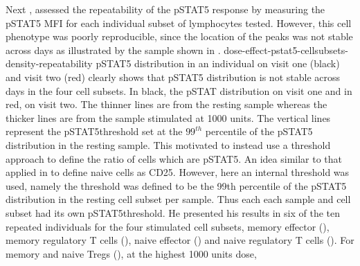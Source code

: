 Next , assessed the repeatability of the pSTAT5 response by measuring the pSTAT5 \gls{MFI}
for each individual subset of lymphocytes tested.
However, this cell phenotype was poorly reproducible, since the location of the peaks was not stable across days as illustrated
by the sample shown in .
{dose-effect-pstat5-cellsubsets-density-repeatability}
{ pSTAT5 distribution in an individual on visit one (black) and visit two (red) clearly shows that pSTAT5 distribution is not stable across days in the four cell
subsets. }
{
In black, the pSTAT distribution on visit one and in red, on visit two.
The thinner lines are from the resting sample whereas the thicker lines are from the sample stimulated at 1000 units.
The vertical lines represent the pSTAT5\positive threshold set at the $99^{th}$ percentile of the pSTAT5 distribution in the resting sample.
}
This motivated  to instead use a threshold approach to define the ratio of cells which are pSTAT5\positive.
An idea similar to that applied in  to define naive cells as CD25\positive.
However, here an internal threshold was used, namely
the threshold was defined to be the 99th percentile of the pSTAT5 distribution in the resting cell subset per sample.
Thus each each sample and cell subset had its own pSTAT5\positive threshold.
He presented his results in six of the ten repeated individuals for the four stimulated cell subsets,
memory effector (),
memory regulatory T cells (),
naive effector ()
and naive regulatory T cells ().
For memory and naive Tregs (), at the highest 1000 units dose,
